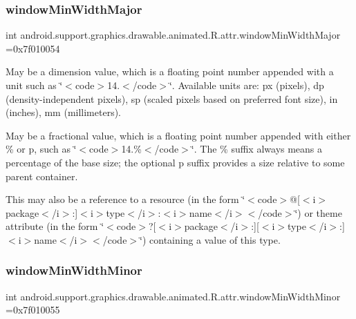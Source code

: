 \subsubsection{\texorpdfstring{window\+Min\+Width\+Major}{windowMinWidthMajor}}
{\footnotesize\ttfamily int android.\+support.\+graphics.\+drawable.\+animated.\+R.\+attr.\+window\+Min\+Width\+Major =0x7f010054\hspace{0.3cm}{\ttfamily [static]}}

May be a dimension value, which is a floating point number appended with a unit such as \char`\"{}$<$code$>$14.\+5sp$<$/code$>$\char`\"{}. Available units are\+: px (pixels), dp (density-\/independent pixels), sp (scaled pixels based on preferred font size), in (inches), mm (millimeters). 

May be a fractional value, which is a floating point number appended with either \% or p, such as \char`\"{}$<$code$>$14.\%$<$/code$>$\char`\"{}. The \% suffix always means a percentage of the base size; the optional p suffix provides a size relative to some parent container. 

This may also be a reference to a resource (in the form \char`\"{}$<$code$>$@\mbox{[}$<$i$>$package$<$/i$>$\+:\mbox{]}$<$i$>$type$<$/i$>$\+:$<$i$>$name$<$/i$>$$<$/code$>$\char`\"{}) or theme attribute (in the form \char`\"{}$<$code$>$?\mbox{[}$<$i$>$package$<$/i$>$\+:\mbox{]}\mbox{[}$<$i$>$type$<$/i$>$\+:\mbox{]}$<$i$>$name$<$/i$>$$<$/code$>$\char`\"{}) containing a value of this type. \mbox{\label{classandroid_1_1support_1_1graphics_1_1drawable_1_1animated_1_1R_1_1attr_a73ac6096ddbad550532471e2e4870132}} 
\subsubsection{\texorpdfstring{window\+Min\+Width\+Minor}{windowMinWidthMinor}}
{\footnotesize\ttfamily int android.\+support.\+graphics.\+drawable.\+animated.\+R.\+attr.\+window\+Min\+Width\+Minor =0x7f010055\hspace{0.3cm}{\ttfamily [static]}}

